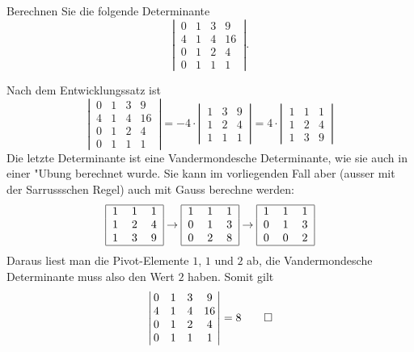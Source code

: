 Berechnen Sie die folgende Determinante
\[
\left|\,\begin{matrix}
0&1&3&9\\
4&1&4&16\\
0&1&2&4\\
0&1&1&1
\end{matrix}\,\right|.
\]


\begin{loesung}
Nach dem Entwicklungssatz ist
\[
\left|\,\begin{matrix}
0&1&3&9\\
4&1&4&16\\
0&1&2&4\\
0&1&1&1
\end{matrix}\,\right|
=-4\cdot\left|\,\begin{matrix}
1&3&9\\
1&2&4\\
1&1&1
\end{matrix}\,\right|
=
4\cdot\left|\,\begin{matrix}
1&1&1\\
1&2&4\\
1&3&9
\end{matrix}\,\right|
\]
Die letzte Determinante ist eine Vandermondesche Determinante,
wie sie auch in einer "Ubung berechnet wurde. Sie kann im vorliegenden
Fall aber (ausser mit der Sarrussschen Regel) auch mit Gauss
berechne werden:
\[
\begin{tabular}{|ccc|}
\hline
1&1&1\\
1&2&4\\
1&3&9\\
\hline
\end{tabular}
\rightarrow
\begin{tabular}{|ccc|}
\hline
1&1&1\\
0&1&3\\
0&2&8\\
\hline
\end{tabular}
\rightarrow
\begin{tabular}{|ccc|}
\hline
1&1&1\\
0&1&3\\
0&0&2\\
\hline
\end{tabular}
\]
Daraus liest man die Pivot-Elemente $1$, $1$ und $2$ ab, die
Vandermondesche Determinante muss also den Wert $2$ haben.
Somit gilt
\[
\left|\,\begin{matrix}
0&1&3&9\\
4&1&4&16\\
0&1&2&4\\
0&1&1&1
\end{matrix}\,\right|
= 8
\qedhere
\]
\end{loesung}

